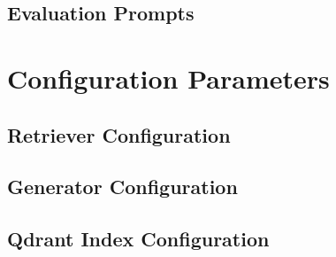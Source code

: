 \subsection{Evaluation Prompts}
\label{subsec:appendix:prompts:evaluation}

%
%
\section{Configuration Parameters}
\label{sec:appendix:config}

\subsection{Retriever Configuration}
\label{subsec:appendix:config:retriever}

\subsection{Generator Configuration}
\label{subsec:appendix:config:generator}

\subsection{Qdrant Index Configuration}
\label{subsec:appendix:config:qdrant}
